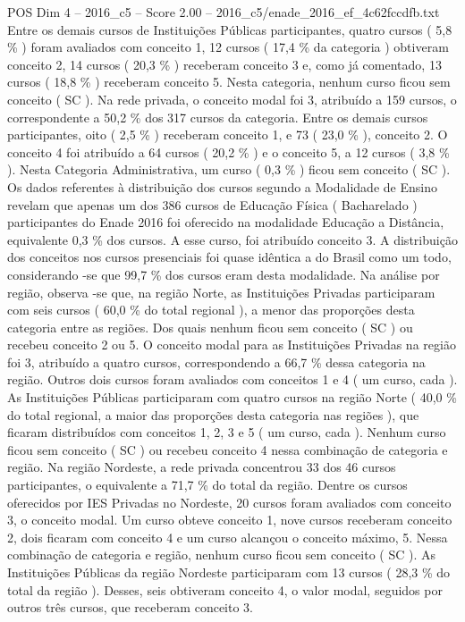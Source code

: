 \begin{textsample}{POS Dim 4 – 2016\_c5 – Score 2.00 – 2016\_c5/enade\_2016\_ef\_4c62fccdfb.txt}
Entre os demais cursos de Instituições Públicas participantes, quatro cursos ( 5,8 \% ) foram avaliados com conceito 1, 12 cursos ( 17,4 \% da categoria ) obtiveram conceito 2, 14 cursos ( 20,3 \% ) receberam conceito 3 e, como já comentado, 13 cursos ( 18,8 \% ) receberam conceito 5.
Nesta categoria, nenhum curso ficou sem conceito ( SC ).
Na rede privada, o conceito modal foi 3, atribuído a 159 cursos, o correspondente a 50,2 \% dos 317 cursos da categoria.
Entre os demais cursos participantes, oito ( 2,5 \% ) receberam conceito 1, e 73 ( 23,0 \% ), conceito 2.
O conceito 4 foi atribuído a 64 cursos ( 20,2 \% ) e o conceito 5, a 12 cursos ( 3,8 \% ).
Nesta Categoria Administrativa, um curso ( 0,3 \% ) ficou sem conceito ( SC ).
Os dados referentes à distribuição dos cursos segundo a Modalidade de Ensino revelam que apenas um dos 386 cursos de Educação Física ( Bacharelado ) participantes do Enade 2016 foi oferecido na modalidade Educação a Distância, equivalente 0,3 \% dos cursos.
A esse curso, foi atribuído conceito 3.
A distribuição dos conceitos nos cursos presenciais foi quase idêntica a do Brasil como um todo, considerando -se que 99,7 \% dos cursos eram desta modalidade.
Na análise por região, observa -se que, na região Norte, as Instituições Privadas participaram com seis cursos ( 60,0 \% do total regional ), a menor das proporções desta categoria entre as regiões.
Dos quais nenhum ficou sem conceito ( SC ) ou recebeu conceito 2 ou 5.
O conceito modal para as Instituições Privadas na região foi 3, atribuído a quatro cursos, correspondendo a 66,7 \% dessa categoria na região.
Outros dois cursos foram avaliados com conceitos 1 e 4 ( um curso, cada ).
As Instituições Públicas participaram com quatro cursos na região Norte ( 40,0 \% do total regional, a maior das proporções desta categoria nas regiões ), que ficaram distribuídos com conceitos 1, 2, 3 e 5 ( um curso, cada ).
Nenhum curso ficou sem conceito ( SC ) ou recebeu conceito 4 nessa combinação de categoria e região.
Na região Nordeste, a rede privada concentrou 33 dos 46 cursos participantes, o equivalente a 71,7 \% do total da região.
Dentre os cursos oferecidos por IES Privadas no Nordeste, 20 cursos foram avaliados com conceito 3, o conceito modal.
Um curso obteve conceito 1, nove cursos receberam conceito 2, dois ficaram com conceito 4 e um curso alcançou o conceito máximo, 5.
Nessa combinação de categoria e região, nenhum curso ficou sem conceito ( SC ).
As Instituições Públicas da região Nordeste participaram com 13 cursos ( 28,3 \% do total da região ).
Desses, seis obtiveram conceito 4, o valor modal, seguidos por outros três cursos, que receberam conceito 3.

\end{textsample}
